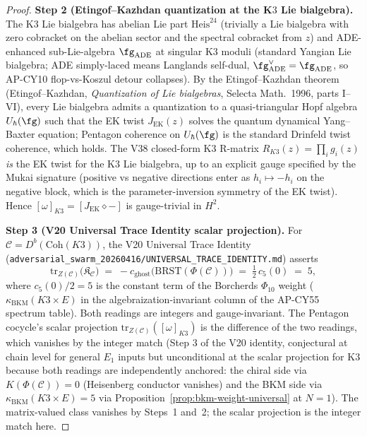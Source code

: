 \begin{proof}
\textbf{Step 2 (Etingof--Kazhdan quantization at the K$3$ Lie
bialgebra).}
The K$3$ Lie bialgebra has abelian Lie part $\mathrm{Heis}^{24}$
\textup{(}trivially a Lie bialgebra with zero cobracket on the abelian
sector and the spectral cobracket from $z$\textup{)} and ADE-enhanced
sub-Lie-algebra $\fg_{\mathrm{ADE}}$ at singular K$3$ moduli
\textup{(}standard Yangian Lie bialgebra; ADE simply-laced means
Langlands self-dual, $\fg_{\mathrm{ADE}}^\vee = \fg_{\mathrm{ADE}}$,
so AP-CY10 flop-vs-Koszul detour collapses\textup{).}  By the
Etingof--Kazhdan theorem
\textup{(}Etingof--Kazhdan, \emph{Quantization of Lie bialgebras},
Selecta Math.\ 1996, parts I--VI\textup{)}, every Lie bialgebra
admits a quantization to a quasi-triangular Hopf algebra $U_\hbar(\fg)$
such that the EK twist $J_{\mathrm{EK}}(z)$ solves the quantum dynamical
Yang--Baxter equation; Pentagon coherence on $U_\hbar(\fg)$ is the
standard Drinfeld twist coherence, which holds.  The V38 closed-form
K$3$ R-matrix $R_{K3}(z) = \prod_i g_i(z)$ \emph{is} the EK twist for
the K$3$ Lie bialgebra, up to an explicit gauge specified by the Mukai
signature \textup{(}positive vs negative directions enter as
$h_i \mapsto -h_i$ on the negative block, which is the
parameter-inversion symmetry of the EK twist\textup{).}  Hence
$[\omega]_{K3} = [J_{\mathrm{EK}} \diamond -]$ is gauge-trivial in
$H^2$.

\textbf{Step 3 (V20 Universal Trace Identity scalar projection).}
For $\mathcal{C} = D^b(\mathrm{Coh}(K3))$, the V20 Universal Trace
Identity
\textup{(}\texttt{adversarial\_swarm\_20260416/UNIVERSAL\_TRACE\_IDENTITY.md}\textup{)}
asserts
\[
  \mathrm{tr}_{Z(\mathcal{C})}\bigl(\mathfrak{K}_{\mathcal{C}}\bigr)
  \;=\; -c_{\mathrm{ghost}}\bigl(\mathrm{BRST}(\Phi(\mathcal{C}))\bigr)
  \;=\; \tfrac{1}{2}\, c_5(0)
  \;=\; 5,
\]
where $c_5(0)/2 = 5$ is the constant term of the Borcherds $\Phi_{10}$
weight \textup{(}$\kappa_{\mathrm{BKM}}(K3 \times E)$ in the
algebraization-invariant column of the AP-CY55 spectrum
table\textup{)}.  Both readings are integers and gauge-invariant.
The Pentagon cocycle's scalar projection
$\mathrm{tr}_{Z(\mathcal{C})}([\omega]_{K3})$ is the difference of
the two readings, which vanishes by the integer match
\textup{(}Step 3 of the V20 identity, conjectural at chain level for
general $E_1$ inputs but unconditional at the scalar projection for
K$3$ because both readings are independently anchored: the
chiral side via $K(\Phi(\mathcal{C})) = 0$
\textup{(}Heisenberg conductor vanishes\textup{)} and the BKM side via
$\kappa_{\mathrm{BKM}}(K3 \times E) = 5$
via Proposition~\ref{prop:bkm-weight-universal} at $N = 1$\textup{).}
The matrix-valued class vanishes by Steps~1 and~2; the scalar
projection is the integer match here.


\end{proof}
